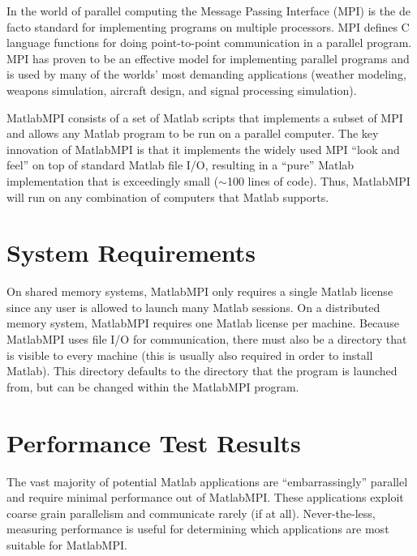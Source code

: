 \documentclass[11pt]{article}
\begin{document}
  In the world of parallel computing the Message Passing Interface (MPI)
\cite{MPI} is the de facto standard for implementing programs on multiple
processors. MPI defines C language functions for doing point-to-point
communication in a parallel program.  MPI has proven to be an effective
model for implementing parallel programs and is used by many of the
worlds' most demanding applications (weather modeling, weapons
simulation, aircraft design, and signal processing simulation).

  MatlabMPI consists of a set of Matlab scripts that implements a subset
of MPI and allows any Matlab program to be run on a parallel computer.
The key innovation of MatlabMPI is that it implements the widely used
MPI ``look and feel'' on top of standard Matlab file I/O, resulting in a
``pure'' Matlab implementation that is exceedingly small ($\sim$100 lines
of code). Thus, MatlabMPI will run on any combination of computers that
Matlab supports.

\section{System Requirements}

  On shared memory systems, MatlabMPI only requires a single Matlab
license since any user is allowed to launch many Matlab sessions. On a
distributed memory system, MatlabMPI requires one Matlab license per
machine. Because MatlabMPI uses file I/O for communication, there must
also be a directory that is visible to every machine (this is usually
also required in order to install Matlab).  This directory defaults to
the directory that the program is launched from, but can be changed
within the MatlabMPI program.


\section{Performance Test Results}

  The vast majority of potential Matlab applications are ``embarrassingly''
parallel and require minimal performance out of MatlabMPI.  These
applications exploit coarse grain parallelism and communicate rarely
(if at all). Never-the-less, measuring performance is useful
for determining which applications are most suitable for MatlabMPI.
\end{document}
